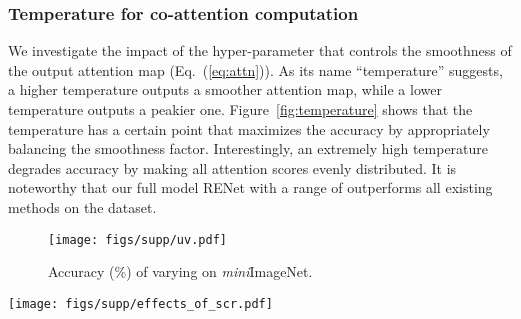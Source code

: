 \documentclass[10pt,twocolumn,letterpaper]{article}
\newcommand{\itmini}{\textit{mini}}
\newcommand{\ours}{RENet\xspace}
\newcommand{\abbself}{SCR\xspace}
\newcommand{\abbcross}{CCA\xspace}
\begin{document}
\subsubsection{Temperature  for co-attention computation}
We investigate the impact of the hyper-parameter  that controls the smoothness of the output attention map (Eq.~(\ref{eq:attn})).
As its name ``temperature'' suggests, a higher temperature outputs a smoother attention map, while a lower temperature outputs a peakier one.
Figure~\ref{fig:temperature} shows that the temperature  has a certain point that maximizes the accuracy by appropriately balancing the smoothness factor.
Interestingly, an extremely high temperature  degrades accuracy by making all attention scores evenly distributed.
It is noteworthy that our full model \ours with a range of  outperforms all existing methods on the dataset.







\begin{figure}[t!]
\centering
\texttt{[image: figs/supp/uv.pdf]}
\vspace{-2mm}
\caption{Accuracy (\%) of varying  on \itmini ImageNet.
\label{fig:uv}}
\vspace{-2mm}
\end{figure} 

















\begin{figure*}[t!]
\centering
\texttt{[image: figs/supp/effects\_of\_scr.pdf]}
\caption{\textbf{Effects of \abbself on \itmini ImageNet}.
``\abbcross w/ \abbself'' captures fine details between two images while ``\abbcross w/o \abbself'' often fails.
The ``base feature map'' and ``\abbself'' columns visualize average channel activations.
The ``\abbcross w/ \abbself'' and ``\abbcross w/o \abbself'' columns visualize co-attention maps.
\label{fig:effects_of_scr}}
\vspace{-2mm}
\end{figure*} 
\end{document}
